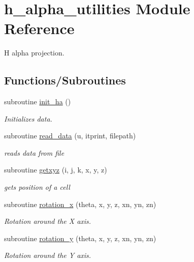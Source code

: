 \hypertarget{namespaceh__alpha__utilities}{}\section{h\+\_\+alpha\+\_\+utilities Module Reference}
\label{namespaceh__alpha__utilities}


H alpha projection.  


\subsection*{Functions/\+Subroutines}
\begin{DoxyCompactItemize}
\item 
subroutine \hyperlink{namespaceh__alpha__utilities_a8bb4ef22ad133f8d3f75cf1a26e14035}{init\+\_\+ha} ()
\begin{DoxyCompactList}\small\item\em Initializes data. \end{DoxyCompactList}\item 
subroutine \hyperlink{namespaceh__alpha__utilities_a5549bf9fd812d02d9189d27f380c01c0}{read\+\_\+data} (u, itprint, filepath)
\begin{DoxyCompactList}\small\item\em reads data from file \end{DoxyCompactList}\item 
subroutine \hyperlink{namespaceh__alpha__utilities_af48cd3c223c292170bc1f90da256f537}{getxyz} (i, j, k, x, y, z)
\begin{DoxyCompactList}\small\item\em gets position of a cell \end{DoxyCompactList}\item 
subroutine \hyperlink{namespaceh__alpha__utilities_a65ad5d15c1265e31f4d191ebf771e669}{rotation\+\_\+x} (theta, x, y, z, xn, yn, zn)
\begin{DoxyCompactList}\small\item\em Rotation around the X axis. \end{DoxyCompactList}\item 
subroutine \hyperlink{namespaceh__alpha__utilities_ab643f1bac838912c58b25923b5de40ca}{rotation\+\_\+y} (theta, x, y, z, xn, yn, zn)
\begin{DoxyCompactList}\small\item\em Rotation around the Y axis. \end{DoxyCompactList}\item 

\end{DoxyCompactItemize}
